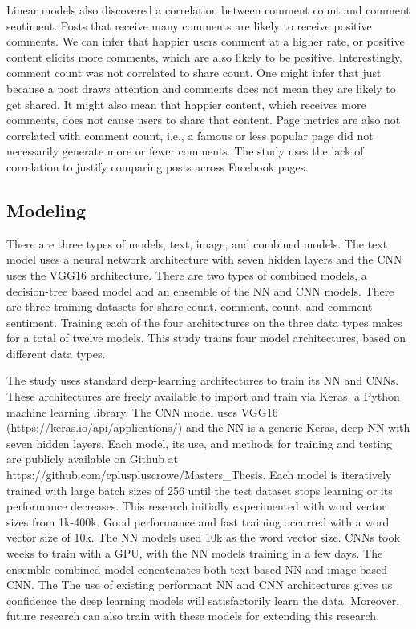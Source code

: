 \documentclass[mksc,blindrev]{informs3} %
\begin{document}
Linear models also discovered a correlation between comment count and comment sentiment. Posts that receive many comments are likely to receive positive comments. We can infer that happier users comment at a higher rate, or positive content elicits more comments, which are also likely to be positive. Interestingly, comment count was not correlated to share count. One might infer that just because a post draws attention and comments does not mean they are likely to get shared. It might also mean that happier content, which receives more comments, does not cause users to share that content. Page metrics are also not correlated with comment count, i.e., a famous or less popular page did not necessarily generate more or fewer comments. The study uses the lack of correlation to justify comparing posts across Facebook pages. 

\subsection{Modeling}

There are three types of models, text, image, and combined models. The text model uses a neural network architecture with seven hidden layers and the CNN uses the VGG16 architecture. There are two types of combined models, a decision-tree based model and an ensemble of the NN and CNN models. There are three training datasets for share count, comment, count, and comment sentiment. Training each of the four architectures on the three data types makes for a total of twelve models. This study trains four model architectures, based on different data types.

The study uses standard deep-learning architectures to train its NN and CNNs. These architectures are freely available to import and train via Keras, a Python machine learning library. The CNN model uses VGG16 (https://keras.io/api/applications/) and the NN is a generic Keras, deep NN with seven hidden layers. Each model, its use, and methods for training and testing are publicly available on Github at https://github.com/cpluspluscrowe/Masters\_Thesis. Each model is iteratively trained with large batch sizes of 256 until the test dataset stops learning or its performance decreases. This research initially experimented with word vector sizes from 1k-400k. Good performance and fast training occurred with a word vector size of 10k. The NN models used 10k as the word vector size. CNNs took weeks to train with a GPU, with the NN models training in a few days. The ensemble combined model concatenates both text-based NN and image-based CNN. The The use of existing performant NN and CNN architectures gives us confidence the deep learning models will satisfactorily learn the data. Moreover, future research can also train with these models for extending this research.
\end{document}
